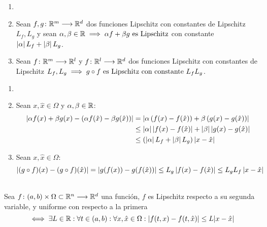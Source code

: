 \begin{prop}
	\begin{enumerate}
		\item[]
		\item Sean $f, g \colon \mathbb{R}^m \longrightarrow \mathbb{R}^d$ dos funciones Lipschitz con constantes de Lipschitz $L_f, L_g$ y sean $\alpha, \beta \in \mathbb{R} \implies \alpha f + \beta g \text{ es Lipschitz}$ con constante $\left|\alpha\right|L_f + \left|\beta\right|L_g$.
		\item Sean $f \colon \mathbb{R}^m \longrightarrow \mathbb{R}^l$ y $f \colon \mathbb{R}^l \longrightarrow \mathbb{R}^d$ dos funciones Lipschitz con constantes de Lipschitz $L_f, L_g \implies g\circ f \text{ es Lipschitz con constante } L_fL_g$.
	\end{enumerate}
	\begin{dem}
		\begin{enumerate}
			\item[]
			\item Sean $x, \hat{x} \in \Omega$ y $\alpha, \beta \in \mathbb{R}$:
			      \[\begin{aligned}
					      \left|\alpha f(x) + \beta g(x) - \left(\alpha f(\hat{x}) - \beta g(\hat{x})\right)\right| & = \left|\alpha\left(f(x) - f(\hat{x})\right) + \beta\left(g(x) - g(\hat{x})\right)\right| \\
					                                                                                         & \leq \left|\alpha\right|\left|f(x) - f(\hat{x})\right| + \left|\beta\right|\left|g(x) - g(\hat{x})\right|      \\
					                                                                                         & \leq \left(\left|\alpha\right|L_f + \left|\beta\right|L_g \right)\left|x-\hat{x}\right|
				      \end{aligned}\]
			\item Sean $x, \hat{x} \in \Omega$:
			      \[\left|(g \circ f)(x) - (g \circ f)(\hat{x}) \right| = \left|g(f(x)) - g(f(\hat{x}))\right| \leq L_g\left|f(x)-f(\hat{x})\right| \leq L_gL_f\left|x-\hat{x}\right|\]
		\end{enumerate}
	\end{dem}
\end{prop}
\begin{defn}  \mbox{} \\
	Sea $f \colon (a,b)\times \Omega \subset \mathbb{R}^n \longrightarrow \mathbb{R}^d$ una función, $f$ es Lipschitz respecto a su segunda variable, y uniforme con respecto a la primera
	\[\iff \exists L \in \mathbb{R} : \forall t \in (a,b) : \forall x, \hat{x} \in \Omega : |f(t,x)-f(t,\hat{x})| \leq L |x-\hat{x}|\]
\end{defn}

